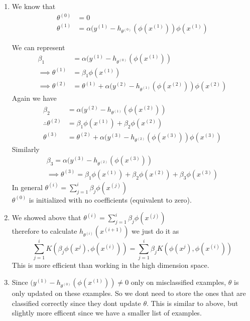 \begin{answer} 
	\begin{enumerate}[label=\roman*.]
		\item We know that
		\begin{align}
		\theta^{(0)}&=0 \\
		\theta^{(1)}&=\alpha(y^{(1)}-h_{\theta^{(0)}}(\phi(x^{(1)}))\phi(x^{(1)})
		\end{align}
		
		We can represent
		\begin{align}
		\beta_{1} &= \alpha(y^{(1)}-h_{\theta^{(0)}}(\phi(x^{(1)})) \\
		\implies \theta^{(1)}&=\beta_{1} \phi(x^{(1)})\\
		\implies \theta^{(2)}&=\theta^{(1)}+\alpha(y^{(2)}-h_{\theta^{(1)}}(\phi(x^{(2)}))\phi(x^{(2)})
		\end{align}
		Again we have
		\begin{align}
		\beta_{2} &= \alpha(y^{(2)}-h_{\theta^{(1)}}(\phi(x^{(2)})) \\
		\therefore \theta^{(2)}&=\beta_{1} \phi(x^{(1)})+\beta_{2} \phi(x^{(2)})\\
		\theta^{(3)}&=\theta^{(2)}+\alpha(y^{(3)}-h_{\theta^{(2)}}(\phi(x^{(3)}))\phi(x^{(3)})
		\end{align}
		Similarly
		\begin{align}
		\beta_{3} = \alpha(y^{(3)}-h_{\theta^{(2)}}(\phi(x^{(3)})) \\
		\implies \theta^{(3)}=\beta_1 \phi(x^{(1)})+\beta_2 \phi(x^{(2)})+\beta_3 \phi(x^{(3)})
		\end{align}
		In general $\theta^{(i)}=\sum_{j=1}^{i}\beta_j \phi(x^{(j)})$ \\
		$\theta^{(0)}$ is initialized with no coefficients (equivalent to zero).\\

		\item We showed above that $\theta^{(i)}=\sum_{j=1}^{i}\beta_j \phi(x^{(j)})$\\
		therefore to calculate $h_{\theta^{(i)}}(x^{(i+1)})$ we just do it as \\
		$$\sum_{j=1}^{i} K(\beta_j\phi(x^{j}),\phi(x^{(i)}))=\sum_{j=1}^{i}\beta_j K(\phi(x^{j}),\phi(x^{(i)}))$$
		This is more efficient than working in the high dimension space.\\

		\item Since $(y^{(1)}-h_{\theta^{(0)}}(\phi(x^{(1)})) \neq 0$ only on misclassified examples, $\theta$ is only updated on these examples. So we dont need to store the ones that are classified correctly since they dont update $\theta$. This is similar to above, but slightly more efficent since we have a smaller list of examples.
	\end{enumerate}
\end{answer}
